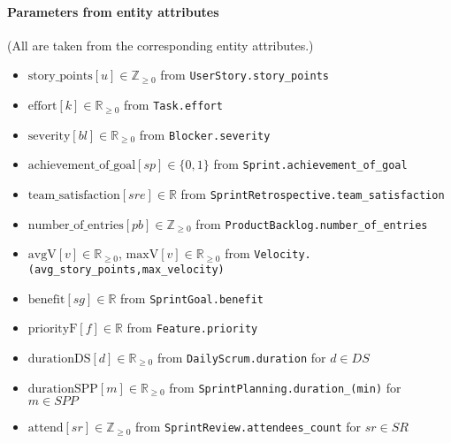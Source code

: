 \documentclass[11pt,a4paper]{article}
\begin{document}
\paragraph{Parameters from entity attributes}
(All are taken from the corresponding entity attributes.)
\begin{itemize}
  \item $\text{story\_points}[u]\in\mathbb{Z}_{\ge 0}$ from \texttt{UserStory.story\_points}
  \item $\text{effort}[k]\in\mathbb{R}_{\ge 0}$ from \texttt{Task.effort}
  \item $\text{severity}[bl]\in\mathbb{R}_{\ge 0}$ from \texttt{Blocker.severity}
  \item $\text{achievement\_of\_goal}[sp]\in\{0,1\}$ from \texttt{Sprint.achievement\_of\_goal}
  \item $\text{team\_satisfaction}[sre]\in\mathbb{R}$ from \texttt{SprintRetrospective.team\_satisfaction}
  \item $\text{number\_of\_entries}[pb]\in\mathbb{Z}_{\ge 0}$ from \texttt{ProductBacklog.number\_of\_entries}
  \item $\text{avgV}[v]\in\mathbb{R}_{\ge 0}$, $\text{maxV}[v]\in\mathbb{R}_{\ge 0}$ from \texttt{Velocity.(avg\_story\_points,max\_velocity)}
  \item $\text{benefit}[sg]\in\mathbb{R}$ from \texttt{SprintGoal.benefit}
  \item $\text{priorityF}[f]\in\mathbb{R}$ from \texttt{Feature.priority}
  \item $\text{durationDS}[d]\in\mathbb{R}_{\ge 0}$ from \texttt{DailyScrum.duration} for $d\in DS$
  \item $\text{durationSPP}[m]\in\mathbb{R}_{\ge 0}$ from \texttt{SprintPlanning.duration\_(min)} for $m\in SPP$
  \item $\text{attend}[sr]\in\mathbb{Z}_{\ge 0}$ from \texttt{SprintReview.attendees\_count} for $sr\in SR$
\end{itemize}
\end{document}

